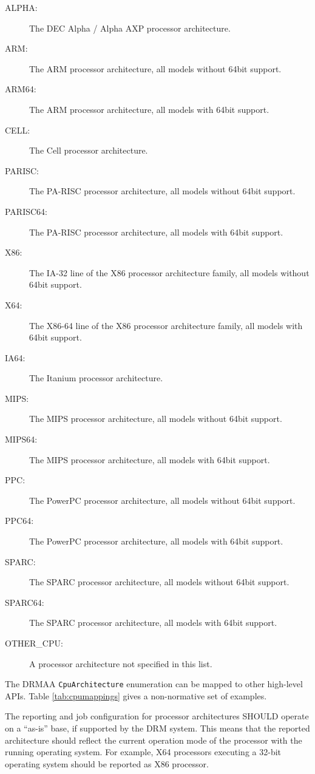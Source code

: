 \documentclass{article}
\newcommand{\h}[1]{\lstinline|#1|}
\begin{document}
\begin{description}
\item[ALPHA:] The DEC Alpha / Alpha AXP processor architecture.
\item[ARM:] The ARM processor architecture, all models without 64bit support.
\item[ARM64:] The ARM processor architecture, all models with 64bit support.
\item[CELL:] The Cell processor architecture.
\item[PARISC:] The PA-RISC processor architecture, all models without 64bit support.
\item[PARISC64:] The PA-RISC processor architecture, all models with 64bit support.
\item[X86:] The IA-32 line of the X86 processor architecture family, all models without 64bit support.
\item[X64:] The X86-64 line of the X86 processor architecture family, all models with 64bit support.
\item[IA64:] The Itanium processor architecture.
\item[MIPS:] The MIPS processor architecture, all models without 64bit support.
\item[MIPS64:] The MIPS processor architecture, all models with 64bit support.
\item[PPC:] The PowerPC processor architecture, all models without 64bit support.
\item[PPC64:] The PowerPC processor architecture, all models with 64bit support.
\item[SPARC:] The SPARC processor architecture, all models without 64bit support.
\item[SPARC64:] The SPARC processor architecture, all models with 64bit support.
\item[OTHER\_CPU:] A processor architecture not specified in this list.
\end{description}

The DRMAA \h{CpuArchitecture} enumeration can be mapped to other high-level APIs. Table \ref{tab:cpumappings} gives a non-normative set of examples.

The reporting and job configuration for processor architectures SHOULD operate on a \enquote{as-is} base, if supported by the DRM system. This means that the reported architecture should reflect the current operation mode of the processor with the running operating system. For example, X64 processors executing a 32-bit operating system should be reported as X86 processor.
\end{document}
